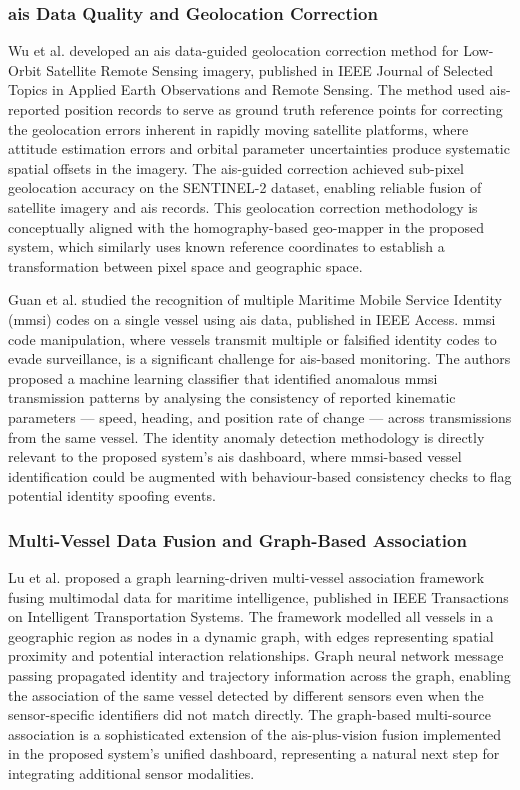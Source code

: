 \subsubsection{\textbf{\gls{ais} Data Quality and Geolocation Correction}}
Wu et al. \cite{Wu2024} developed an \gls{ais} data-guided geolocation correction method
for Low-Orbit Satellite Remote Sensing imagery, published in IEEE Journal of Selected
Topics in Applied Earth Observations and Remote Sensing. The method used \gls{ais}-reported
position records to serve as ground truth reference points for correcting the
geolocation errors inherent in rapidly moving satellite platforms, where attitude
estimation errors and orbital parameter uncertainties produce systematic spatial
offsets in the imagery. The \gls{ais}-guided correction achieved sub-pixel geolocation
accuracy on the SENTINEL-2 dataset, enabling reliable fusion of satellite imagery
and \gls{ais} records. This geolocation correction methodology is conceptually aligned
with the homography-based geo-mapper in the proposed system, which similarly uses
known reference coordinates to establish a transformation between pixel space and
geographic space.
 
Guan et al. \cite{Guan2023} studied the recognition of multiple Maritime Mobile
Service Identity (\gls{mmsi}) codes on a single vessel using \gls{ais} data, published in
IEEE Access. \gls{mmsi} code manipulation, where vessels transmit multiple or falsified
identity codes to evade surveillance, is a significant challenge for \gls{ais}-based
monitoring. The authors proposed a machine learning classifier that identified
anomalous \gls{mmsi} transmission patterns by analysing the consistency of reported
kinematic parameters --- speed, heading, and position rate of change --- across
transmissions from the same vessel. The identity anomaly detection methodology
is directly relevant to the proposed system's \gls{ais} dashboard, where \gls{mmsi}-based
vessel identification could be augmented with behaviour-based consistency checks
to flag potential identity spoofing events.
 
\subsubsection{\textbf{Multi-Vessel Data Fusion and Graph-Based Association}}
Lu et al. \cite{Lu2026} proposed a graph learning-driven multi-vessel association
framework fusing multimodal data for maritime intelligence, published in IEEE
Transactions on Intelligent Transportation Systems. The framework modelled all
vessels in a geographic region as nodes in a dynamic graph, with edges representing
spatial proximity and potential interaction relationships. Graph neural network
message passing propagated identity and trajectory information across the graph,
enabling the association of the same vessel detected by different sensors even
when the sensor-specific identifiers did not match directly. The graph-based
multi-source association is a sophisticated extension of the \gls{ais}-plus-vision fusion
implemented in the proposed system's unified dashboard, representing a natural next
step for integrating additional sensor modalities.
 

